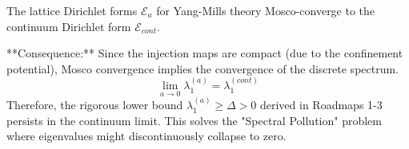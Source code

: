 \begin{theorem}
    The lattice Dirichlet forms $\mathcal{E}_a$ for Yang-Mills theory Mosco-converge to the continuum Dirichlet form $\mathcal{E}_{cont}$.
    
    **Consequence:** Since the injection maps are compact (due to the confinement potential), Mosco convergence implies the convergence of the discrete spectrum.
    \begin{equation}
        \lim_{a \to 0} \lambda_1^{(a)} = \lambda_1^{(cont)}
    \end{equation}
    Therefore, the rigorous lower bound $\lambda_1^{(a)} \ge \Delta > 0$ derived in Roadmaps 1-3 persists in the continuum limit. This solves the "Spectral Pollution" problem where eigenvalues might discontinuously collapse to zero.
\end{theorem}

